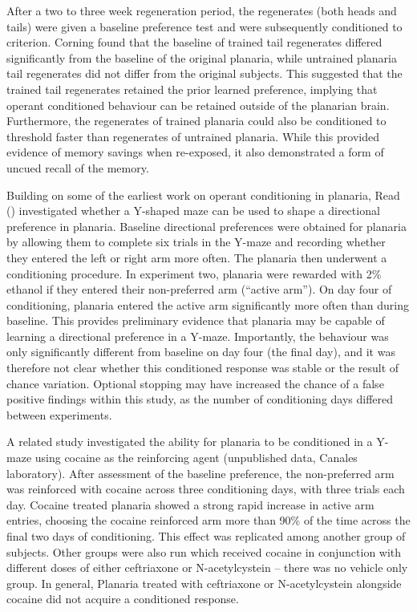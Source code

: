 \documentclass[
  jou,
  floatsintext,
  longtable,
  nolmodern,
  notxfonts,
  notimes,
  donotrepeattitle,
  colorlinks=true,linkcolor=blue,citecolor=blue,urlcolor=blue]{apa7}
\begin{document}
After a two to three week regeneration period, the regenerates (both
heads and tails) were given a baseline preference test and were
subsequently conditioned to criterion. Corning found that the baseline
of trained tail regenerates differed significantly from the baseline of
the original planaria, while untrained planaria tail regenerates did not
differ from the original subjects. This suggested that the trained tail
regenerates retained the prior learned preference, implying that operant
conditioned behaviour can be retained outside of the planarian brain.
Furthermore, the regenerates of trained planaria could also be
conditioned to threshold faster than regenerates of untrained planaria.
While this provided evidence of memory savings when re-exposed, it also
demonstrated a form of uncued recall of the memory.

Building on some of the earliest work on operant conditioning in
planaria, Read () investigated
whether a Y-shaped maze can be used to shape a directional preference in
planaria. Baseline directional preferences were obtained for planaria by
allowing them to complete six trials in the Y-maze and recording whether
they entered the left or right arm more often. The planaria then
underwent a conditioning procedure. In experiment two, planaria were
rewarded with 2\% ethanol if they entered their non-preferred arm
(``active arm''). On day four of conditioning, planaria entered the
active arm significantly more often than during baseline. This provides
preliminary evidence that planaria may be capable of learning a
directional preference in a Y-maze. Importantly, the behaviour was only
significantly different from baseline on day four (the final day), and
it was therefore not clear whether this conditioned response was stable
or the result of chance variation. Optional stopping may have increased
the chance of a false positive findings within this study, as the number
of conditioning days differed between experiments.

A related study investigated the ability for planaria to be conditioned
in a Y-maze using cocaine as the reinforcing agent (unpublished data,
Canales laboratory). After assessment of the baseline preference, the
non-preferred arm was reinforced with cocaine across three conditioning
days, with three trials each day. Cocaine treated planaria showed a
strong rapid increase in active arm entries, choosing the cocaine
reinforced arm more than 90\% of the time across the final two days of
conditioning. This effect was replicated among another group of
subjects. Other groups were also run which received cocaine in
conjunction with different doses of either ceftriaxone or
N-acetylcystein -- there was no vehicle only group. In general, Planaria
treated with ceftriaxone or N-acetylcystein alongside cocaine did not
acquire a conditioned response.
\end{document}
